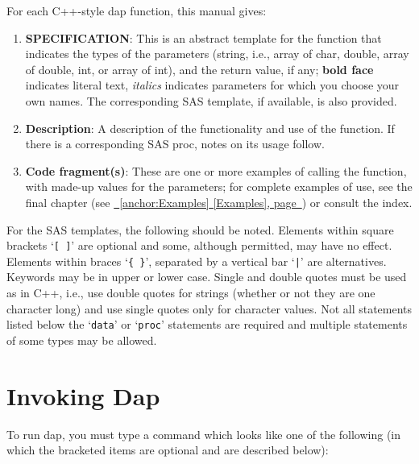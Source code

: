 \documentclass{book}
\newcommand\Texinfocommandstyletextvar[1]{{\normalfont{}\textsl{#1}}}%
\renewcommand{\_}{\Texinfounderscore\discretionary{}{}{}}
\begin{document}
For each C++-style dap function, this manual
%
%
gives:

\begin{enumerate}[start=1]
\item \textbf{SPECIFICATION}: This is an abstract template for the function that indicates the
types of the parameters (string,
%
%
%
i.e., array of char, double, array of double, int,
or array of int), and the return value, if any; \textbf{bold face} indicates
literal text, \Texinfocommandstyletextvar{italics} indicates parameters for which you choose your own
names. The corresponding SAS template, if available, is also provided.

\item \textbf{Description}: A description of the functionality and use of the function.
If there is a corresponding SAS proc, notes on its usage follow.

\item \textbf{Code fragment(s)}: These are one or more examples of calling the function, with made-up values
for the parameters; for complete examples of use, see the final chapter
(see \hyperref[anchor:Examples]{\chaptername~\ref*{anchor:Examples} [Examples], page~\pageref*{anchor:Examples}}) or consult the index.  
\end{enumerate}

%
For the SAS templates, the following should be noted.
Elements within square brackets `\texttt{[ ]}' are optional and
some, although permitted, may have no effect.
Elements within braces `\texttt{\{\ \}}', separated by a vertical bar `\texttt{|}' are
alternatives.
Keywords may be in upper or lower case.
Single and double quotes must be used as in C++, i.e., use double quotes
for strings (whether or not they are one character long) and
use single quotes only for character values.
Not all statements listed below the `\texttt{data}' or `\texttt{proc}'
statements are required and multiple statements of some types may be allowed.

\section{{Invoking Dap}}
\label{anchor:Invoking-Dap}%
%
%

To run dap, you must type a command which looks like one of the following
(in which the bracketed items are optional and are described below):
\end{document}
